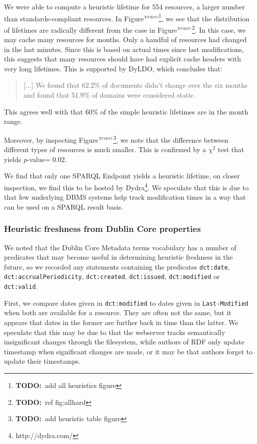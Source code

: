 \documentclass{llncs}
\newcommand{\rdfterm}[1]{\texttt{#1}}
\newcommand{\pvalue}{\textit{p}-value}
\newcommand{\httph}[1]{\texttt{#1}}
\newcommand{\todo}[1]{\ensuremath{^{\textrm{\tiny{TODO}\normalsize}}}\footnote{\textbf{TODO:}~#1}}
\begin{document}
We were able to compute a heuristic lifetime for 554 resources, a
larger number than standards-compliant resources. In Figure\todo{add all
  heuristics figure}, we see that the distribution of lifetimes are
radically different from the case in Figure\todo{ref fig:allhard}. In
this case, we may cache many resources for months. Only a handful of
resources had changed in the last minutes. Since this is based
on actual times since last modifications, this suggests that many
resources should have had explicit cache headers with very long
lifetimes. This is supported by DyLDO\cite{dyldo2}, which concludes that:
\begin{quote}
[...] We found that 62.2\% of documents didn’t change over the six
months and found that 51.9\% of domains were considered static.
\end{quote}
This agrees well with that 60\% of the simple heuristic lifetimes are
in the month range. 

Moreover, by inspecting Figure\todo{add heuristic table figure}, we
note that the difference between different types of resources is much
smaller. This is confirmed by a $\chi^2$ test that yields \pvalue =
0.02.

We find that only one SPARQL Endpoint yields a heuristic lifetime, on
closer inspection, we find this to be hosted by
Dydra\footnote{http://dydra.com/}. We speculate that this is due to
that few underlying DBMS systems help track modification times in a
way that can be used on a SPARQL result basis.

\subsubsection{Heuristic freshness from Dublin Core properties}

We noted that the Dublin Core Metadata terms vocabulary has a number
of predicates that may become useful in determining heuristic
freshness in the future, so we recorded any statements containing the
predicates \rdfterm{dct:date}, \rdfterm{dct:accrualPeriodicity},
\rdfterm{dct:created}, \rdfterm{dct:issued}, \rdfterm{dct:modified} or
\rdfterm{dct:valid}.

First, we compare dates given in \rdfterm{dct:modified} to dates given
in \httph{Last-Modified} when both are available for a resource. They
are often not the same, but it appears that dates in the former are
further back in time than the latter. We speculate that this may be
due to that the webserver tracks semantically insignificant changes
through the filesystem, while authors of RDF only update timestamp
when significant changes are made, or it may be that authors forget to
update their timestamps.
\end{document}
